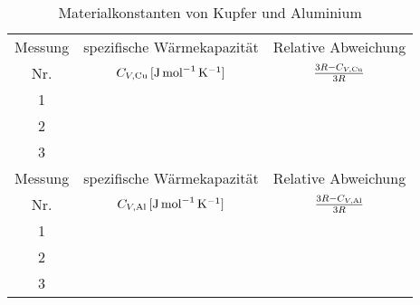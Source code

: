 	\begin{table}[!h]
		\centering
		\begin{tabular}{|c|c|c|}
			\hline
			Messung & spezifische Wärmekapazität & Relative Abweichung \\
			Nr.		& $ C_{V,\ce{Cu}}\,[\si{\joule\per\mol\per\kelvin}]  $ &$ \frac{3R - C_{V,\ce{Cu}}}{3R}$ \\ \hline \hline
			1 &&\\
			2 &&\\
		    3 &&\\ \hline \hline
	    	Messung & spezifische Wärmekapazität & Relative Abweichung \\
   			Nr.		& $ C_{V,\ce{Al}}\,[\si{\joule\per\mol\per\kelvin}]  $ & $ \frac{3R - C_{V,\ce{Al}}}{3R}$ \\ \hline \hline
   			1 &&\\
   			2 &&\\
	   	    3 &&\\ \hline
		    
		\end{tabular}
		\caption{Materialkonstanten von Kupfer und Aluminium \label{tab:Cv_Metalle}}
	\end{table}
	
	
